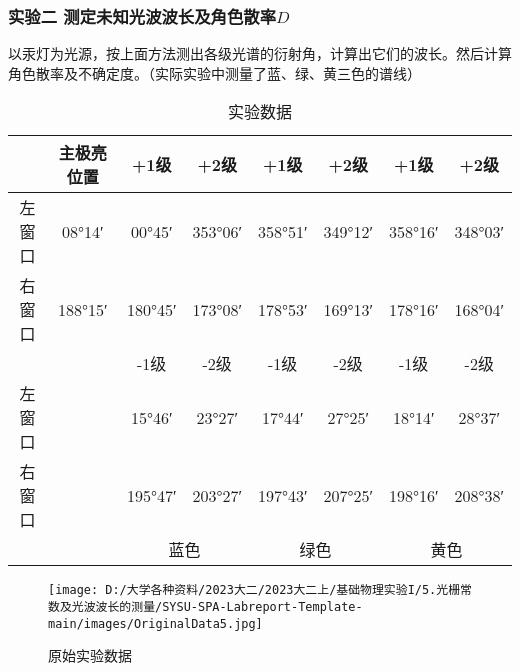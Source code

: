 \documentclass[dvipsnames, svgnames,a4paper,11pt]{article}
\begin{document}
	\subsubsection{实验二 测定未知光波波长及角色散率$D$}

		以汞灯为光源，按上面方法测出各级光谱的衍射角，计算出它们的波长。然后计算角色散率及不确定度。（实际实验中测量了蓝、绿、黄三色的谱线）
		
	\begin{table}[htbp]
		\centering
		\begin{tabular}{|c|c|c|c|c|c|c|c|}
			\hline
			& 主极亮位置 & +1级 & +2级 & +1级 & +2级 & +1级 & +2级 \\
			\hline
			左窗口 & 08°14′ & 00°45′ & 353°06′ & 358°51′ & 349°12′ & 358°16′ & 348°03′ \\
			\hline
			右窗口 & 188°15′ & 180°45′ & 173°08′ & 178°53′ & 169°13′ & 178°16′ & 168°04′ \\
			\hline
			& & -1级 & -2级 & -1级 & -2级 & -1级 & -2级 \\
			\hline
			左窗口 & & 15°46′ & 23°27′ & 17°44′ & 27°25′ & 18°14′ & 28°37′ \\
			\hline
			右窗口 & & 195°47′ & 203°27′ & 197°43′ & 207°25′ & 198°16′ & 208°38′ \\
			\hline
			\multicolumn{2}{|c}{} &\multicolumn{2}{|c|}{蓝色} & \multicolumn{2}{c|}{绿色} & \multicolumn{2}{c|}{黄色} \\
			\hline
		\end{tabular}
		\caption{实验数据}
		\label{tab:data2}
	\end{table}
	
		
		
		\begin{figure}[H]
			\centering
			\texttt{[image: D:/大学各种资料/2023大二/2023大二上/基础物理实验I/5.光栅常数及光波波长的测量/SYSU-SPA-Labreport-Template-main/images/OriginalData5.jpg]}
			\caption{原始实验数据}
		\end{figure}




\end{document}
